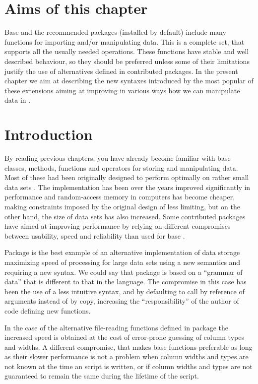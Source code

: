 \documentclass[krantz2]{krantz}\usepackage{knitr}%
\begin{document}
\section{Aims of this chapter}

Base \Rlang and the recommended packages (installed by default) include many functions for importing and/or manipulating data. This is a complete set, that supports all the usually needed operations. These functions have stable and well described behaviour, so they should be preferred unless some of their limitations justify the use of alternatives defined in contributed packages. In the present chapter we aim at describing the new syntaxes introduced by the most popular of these extensions aiming at improving in various ways how we can manipulate data in \Rlang.

\section{Introduction}

By reading previous chapters, you have already become familiar with base \Rlang classes, methods, functions and operators for storing and manipulating data. Most of these had been originally designed to perform optimally on rather small data sets \autocite[see][]{Matloff2011}. The \Rlang implementation has been over the years improved significantly in performance and random-access memory in computers has become cheaper, making constraints imposed by the original design of \Rlang less limiting, but on the other hand, the size of data sets has also increased. Some contributed packages have aimed at improving performance by relying on different compromises between usability, speed and reliability than used for base \Rlang. 

Package  is the best example of an alternative implementation of data storage maximizing speed of processing for large data sets using a new semantics and requiring a new syntax. We could say that package  is based on a ``grammar of data'' that is different to that in the \Rlang language. The compromise in this case has been the use of a less intuitive syntax, and by defaulting to call by reference of arguments instead of by copy, increasing the ``responsibility'' of the author of code defining new functions.

In the case of the alternative file-reading functions defined in package  the increased speed is obtained at the cost of error-prone guessing of column types and widths. A different compromise, that makes base \Rlang functions preferable as long as their slower performance is not a problem when column widths and types are not known at the time an script is written, or if column widths and types are not guaranteed to remain the same during the lifetime of the script.
\end{document}
